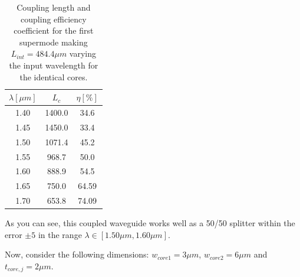\documentclass[a4paper,12pt]{article}
\begin{document}
\begin{table}[H]
    \centering
    \begin{tabular}{ccc}
        \toprule
        $\lambda [\mu m]$ & $L_c$ & $\eta[\%]$ \\
        \midrule
        1.40 & 1400.0 & 34.6 \\
        1.45 & 1450.0 & 33.4 \\
        1.50 & 1071.4 & 45.2 \\
        1.55 & 968.7 & 50.0 \\
        1.60 & 888.9 & 54.5 \\
        1.65 & 750.0 & 64.59 \\
        1.70 & 653.8 & 74.09 \\    
        \bottomrule
    \end{tabular}
    \caption{Coupling length and coupling efficiency coefficient for the first supermode making $L_{int} = 484.4\mu m$ varying the input wavelength for the identical cores.}
    \label{tab:wv_var}
\end{table}

As you can see, this coupled waveguide works well as a 50/50 splitter within the error $\pm 5$ in the range $\lambda \in [1.50 \mu m, 1.60\mu m]$. 

Now, consider the following dimensions: $w_{core1} = 3\mu m$, $w_{core2} = 6\mu m$ and $t_{core,j} = 2\mu m$.
\end{document}
